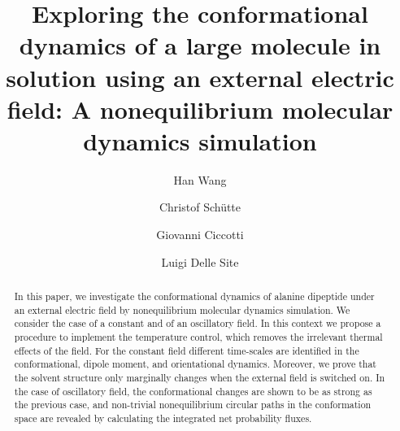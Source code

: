 \documentclass[a4paper,preprint,unsortedaddress,onecolumn]{revtex4-1}
\begin{document}
\title{Exploring the conformational dynamics of a large molecule in solution using an external electric field: A nonequilibrium molecular dynamics simulation}
\author{Han Wang}
\author{Christof Sch\"utte}
\author{Giovanni Ciccotti}
\author{Luigi Delle Site}
   
\begin{abstract}
In this paper, we investigate the conformational dynamics of alanine
   dipeptide under an external electric field by 
   nonequilibrium molecular dynamics simulation.  We consider
   the case of a constant and of an oscillatory field. In this context we
propose a procedure to
   implement the temperature control, which removes the irrelevant thermal
effects of the field. For the constant field different time-scales are
   identified  in the conformational, dipole moment, and orientational
   dynamics. Moreover, we prove that the solvent structure only
   marginally changes when the external field is switched on.  In the
   case of oscillatory field, the conformational changes are shown to be as
   strong as the previous case, and non-trivial nonequilibrium
   circular paths in the conformation space are revealed by calculating the
   integrated net probability fluxes.
  
\end{abstract}

\maketitle
\end{document}
